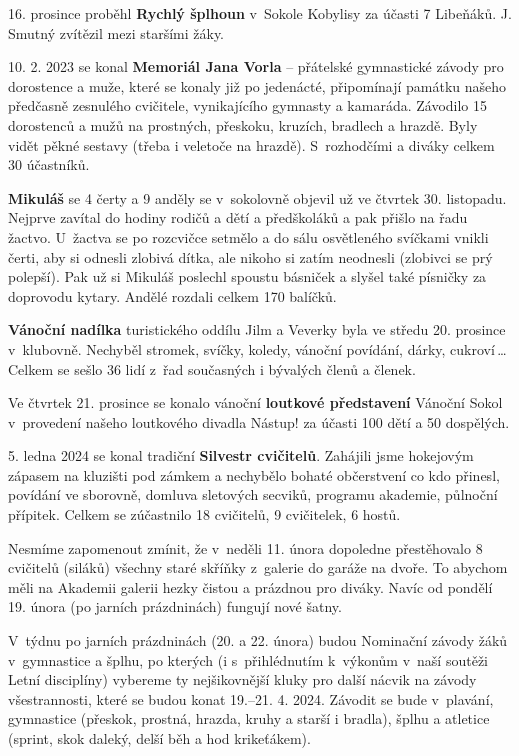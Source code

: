 \documentclass[11pt]{article}
\begin{document}
16. prosince proběhl \textbf{Rychlý šplhoun} v~Sokole Kobylisy za účasti 7 Libeňáků. J. Smutný zvítězil mezi staršími žáky.

10. 2. 2023 se konal \textbf{Memoriál Jana Vorla} – přátelské gymnastické závody pro dorostence a muže, které se konaly již po jedenácté, připomínají památku našeho předčasně zesnulého cvičitele, vynikajícího gymnasty a kamaráda. Závodilo 15 dorostenců a mužů na prostných, přeskoku, kruzích, bradlech a hrazdě. Byly vidět pěkné sestavy (třeba i veletoče na hrazdě). S~rozhodčími a diváky celkem 30 účastníků.


\textbf{Mikuláš} se 4 čerty a 9 anděly se v~sokolovně objevil už ve čtvrtek 30. listopadu. Nejprve zavítal do hodiny rodičů a dětí a předškoláků a pak přišlo na řadu žactvo. U~žactva se po rozcvičce setmělo a do sálu osvětleného svíčkami vnikli čerti, aby si odnesli zlobivá dítka, ale nikoho si zatím neodnesli (zlobivci se prý polepší). Pak už si Mikuláš poslechl spoustu básniček a slyšel také písničky za doprovodu kytary. Andělé rozdali celkem 170 balíčků.

\textbf{Vánoční nadílka} turistického oddílu Jilm a Veverky byla ve středu 20. prosince v~klubovně. Nechyběl stromek, svíčky, koledy, vánoční povídání, dárky, cukroví\,\dots{} Celkem se sešlo 36 lidí z~řad současných i bývalých členů a členek.

Ve čtvrtek 21. prosince se konalo vánoční \textbf{loutkové představení} Vánoční Sokol v~provedení našeho loutkového divadla Nástup! za účasti 100 dětí a 50 dospělých.

5. ledna 2024 se konal tradiční \textbf{Silvestr cvičitelů}. Zahájili jsme hokejovým zápasem na kluzišti pod zámkem a nechybělo bohaté občerstvení \luv{}co kdo přinesl\ruv{}, povídání ve sborovně, domluva sletových secviků, programu akademie, půlnoční přípitek. Celkem se zúčastnilo 18 cvičitelů, 9 cvičitelek, 6 hostů.

Nesmíme zapomenout zmínit, že v~neděli 11. února dopoledne přestěhovalo 8 cvičitelů (siláků) všechny staré skříňky z~galerie do garáže na dvoře. To abychom měli na Akademii galerii hezky čistou a prázdnou pro diváky. Navíc od pondělí 19. února (po jarních prázdninách) fungují nové šatny.

V~týdnu po jarních prázdninách (20. a 22. února) budou Nominační závody žáků v~gymnastice a šplhu, po kterých (i s~přihlédnutím k~výkonům v~naší soutěži Letní disciplíny) vybereme ty nejšikovnější kluky pro další nácvik na závody všestrannosti, které se budou konat 19.–21. 4. 2024. Závodit se bude v~plavání, gymnastice (přeskok, prostná, hrazda, kruhy a starší i bradla), šplhu a atletice (sprint, skok daleký, delší běh a hod krikeťákem).     
\end{document}
